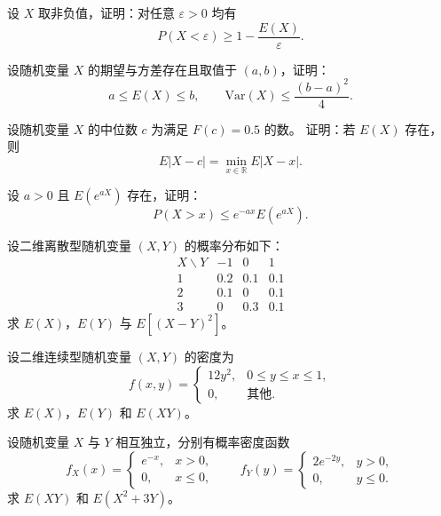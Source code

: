 \begin{homework}[3.15]
设 $X$ 取非负值，证明：对任意 $\varepsilon>0$ 均有
\[
P(X<\varepsilon)\ge 1-\frac{E(X)}{\varepsilon}.
\]
\end{homework}

\begin{homework}[3.16]
设随机变量 $X$ 的期望与方差存在且取值于 $(a,b)$，证明：
\[
a\le E(X)\le b,\qquad 
\mathrm{Var}(X)\le \frac{(b-a)^2}{4}.
\]
\end{homework}

\begin{homework}[3.17]
设随机变量 $X$ 的中位数 $c$ 为满足 $F(c)=0.5$ 的数。
证明：若 $E(X)$ 存在，则
\[
E|X-c|=\min_{x\in\mathbb{R}}E|X-x|.
\]
\end{homework}

\begin{homework}[3.18]
设 $a>0$ 且 $E(e^{aX})$ 存在，证明：
\[
P(X>x)\le e^{-ax}E(e^{aX}).
\]
\end{homework}

\begin{homework}[3.19]
设二维离散型随机变量 $(X,Y)$ 的概率分布如下：
\[
\begin{array}{c|ccc}
  X\backslash Y & -1 & 0 & 1\\ \hline
  1 & 0.2 & 0.1 & 0.1\\
  2 & 0.1 & 0 & 0.1\\
  3 & 0 & 0.3 & 0.1
\end{array}
\]
求 $E(X)$，$E(Y)$ 与 $E[(X-Y)^2]$。
\end{homework}

\begin{homework}[3.20]
设二维连续型随机变量 $(X,Y)$ 的密度为
\[
f(x,y)=
\begin{cases}
12y^2,& 0\le y\le x\le1,\\[4pt]
0,&\text{其他}.
\end{cases}
\]
求 $E(X)$，$E(Y)$ 和 $E(XY)$。
\end{homework}
\begin{homework}[3.21]
设随机变量 $X$ 与 $Y$ 相互独立，分别有概率密度函数
\[
f_X(x)=
\begin{cases}
e^{-x}, & x>0,\\
0, & x\le0,
\end{cases}
\qquad
f_Y(y)=
\begin{cases}
2e^{-2y}, & y>0,\\
0, & y\le0.
\end{cases}
\]
求 $E(XY)$ 和 $E(X^2+3Y)$。
\end{homework}

